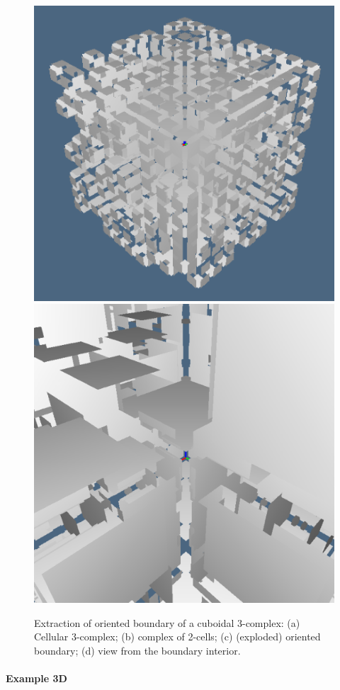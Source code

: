 \documentclass[11pt,oneside]{article}	%
\begin{document}
\begin{figure}[htbp]
   \includegraphics[height=0.245\linewidth,width=0.244\linewidth]{images/3Dsigned2} 
   \includegraphics[height=0.245\linewidth,width=0.244\linewidth]{images/3Dsigned3} 
   \caption{Extraction of oriented boundary of a cuboidal 3-complex: (a) Cellular 3-complex; (b) complex of 2-cells; (c) (exploded) oriented boundary; (d) view from the boundary interior.}
   \label{fig:2-3-complex}
\end{figure}


\paragraph{Example 3D}
\end{document}
